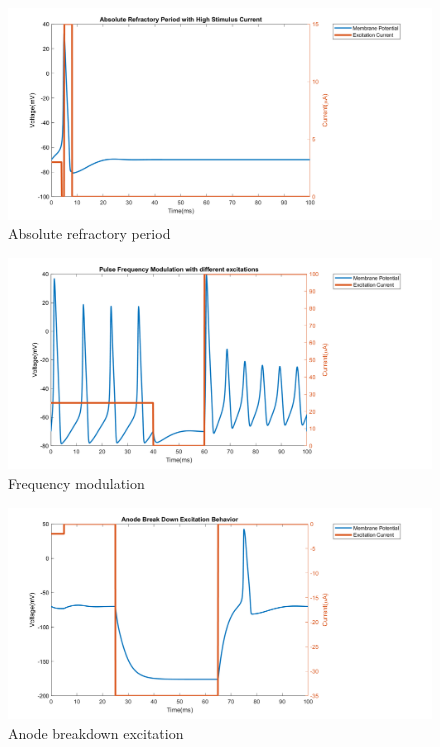 \documentclass{IEEEtran}
\begin{document}
\begin{figure}[h]
\centering
\includegraphics[width=\textwidth]{Fig5.png}
\caption{Absolute refractory period}\label{fig:arp}
\end{figure}
\begin{figure}[h]
\centering
\includegraphics[width=\textwidth]{Fig2.png}
\caption{Frequency modulation}\label{fig:fm}
\end{figure}
\begin{figure}[h]
\centering
\includegraphics[width=\textwidth]{Fig4.png}
\caption{Anode breakdown excitation}\label{fig:abe}
\end{figure}
\end{document}
